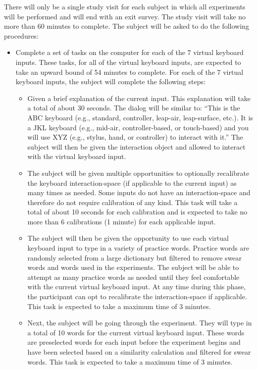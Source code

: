 There will only be a single study visit for each subject in which all experiments will be performed and will end with an exit survey. The study visit will take no more than 60 minutes to complete. The subject will be asked to do the following procedures:

\begin{itemize}
\item Complete a set of tasks on the computer for each of the 7 virtual keyboard inputs. These tasks, for all of the virtual keyboard inputs, are expected to take an upward bound of 54 minutes to complete. For each of the 7 virtual keyboard inputs, the subject will complete the following steps:
\begin{itemize}
\item Given a brief explanation of the current input. This explanation will take a total of about 30 seconds. The dialog will be similar to: “This is the ABC keyboard (e.g., standard, controller, leap-air, leap-surface, etc.). It is a JKL keyboard (e.g., mid-air, controller-based, or touch-based) and you will use XYZ (e.g., stylus, hand, or controller) to interact with it.” The subject will then be given the interaction object and allowed to interact with the virtual keyboard input.
\item The subject will be given multiple opportunities to optionally recalibrate the keyboard interaction-space (if applicable to the current input) as many times as needed. Some inputs do not have an interaction-space and therefore do not require calibration of any kind. This task will take a total of about 10 seconds for each calibration and is expected to take no more than 6 calibrations (1 minute) for each applicable input.
\item The subject will then be given the opportunity to use each virtual keyboard input to type in a variety of practice words. Practice words are randomly selected from a large dictionary but filtered to remove swear words and words used in the experiments. The subject will be able to attempt as many practice words as needed until they feel comfortable with the current virtual keyboard input. At any time during this phase, the participant can opt to recalibrate the interaction-space if applicable. This task is expected to take a maximum time of 3 minutes.
\item Next, the subject will be going through the experiment. They will type in a total of 10 words for the current virtual keyboard input. These words are preselected words for each input before the experiment begins and have been selected based on a similarity calculation and filtered for swear words. This task is expected to take a maximum time of 3 minutes.

\end{itemize}
\end{itemize}
